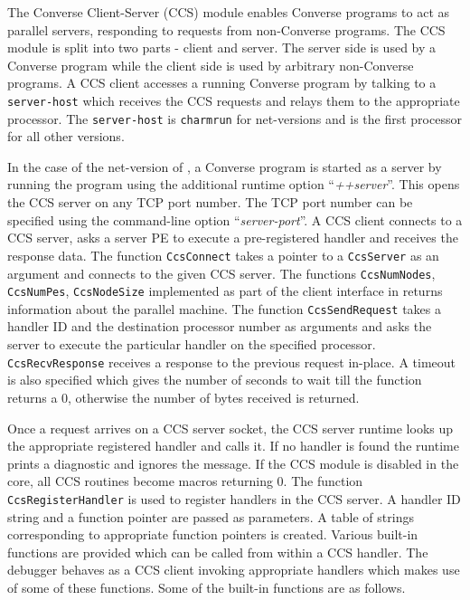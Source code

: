 \documentclass[10pt,dvips]{article}
\begin{document}
The Converse Client-Server (CCS) module enables Converse
\cite{InterOpIPPS96} programs to act as parallel servers,
responding to requests from non-Converse programs. The CCS module
is split into two parts - client and server. The server side is
used by a Converse program while the client side is used by
arbitrary non-Converse programs. A CCS client accesses a running
Converse program by talking to a \texttt{server-host} which
receives the CCS requests and relays them to the appropriate
processor. The \texttt{server-host} is \texttt{charmrun}
\cite{charmman} for net-versions and is the first processor for
all other versions.

In the case of the net-version of \charmpp{}, a Converse program
is started as a server by running the \charmpp{} program using the
additional runtime option ``\textit{++server}''. This opens the CCS
server on any TCP port number. The TCP port number can be
specified using the command-line option ``\textit{server-port}''. A
CCS client connects to a CCS server, asks a server PE to execute a
pre-registered handler and receives the response data. The
function \texttt{CcsConnect} takes a pointer to a
\texttt{CcsServer} as an argument and connects to the given CCS
server. The functions \texttt{CcsNumNodes}, \texttt{CcsNumPes},
\texttt{CcsNodeSize} implemented as part of the client interface
in \charmpp{} returns information about the parallel machine. The
function \texttt{CcsSendRequest} takes a handler ID and the
destination processor number as arguments and asks the server to
execute the particular handler on the specified processor.
\texttt{CcsRecvResponse} receives a response to the previous
request in-place. A timeout is also specified which gives the
number of seconds to wait till the function returns a 0, otherwise
the number of bytes received is returned.

Once a request arrives on a CCS server socket, the CCS server
runtime looks up the appropriate registered handler and calls it.
If no handler is found the runtime prints a diagnostic and ignores
the message. If the CCS module is disabled in the core, all CCS
routines become macros returning 0. The function
\texttt{CcsRegisterHandler} is used to register handlers in the
CCS server. A handler ID string and a function pointer are passed
as parameters. A table of strings corresponding to appropriate
function pointers is created. Various built-in functions are
provided which can be called from within a CCS handler. The
debugger behaves as a CCS client invoking appropriate handlers
which makes use of some of these functions. Some of the built-in
functions are as follows.
\end{document}
